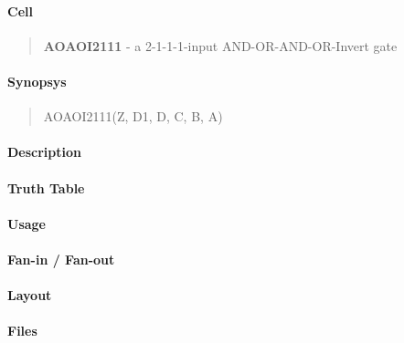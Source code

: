 \label{AOAOI2111}
\paragraph{Cell}
\begin{quote}
    \textbf{AOAOI2111} - a 2-1-1-1-input AND-OR-AND-OR-Invert gate
\end{quote}

\paragraph{Synopsys}
\begin{quote}
    AOAOI2111(Z, D1, D, C, B, A)
\end{quote}

\paragraph{Description}

%

\paragraph{Truth Table}
%

\paragraph{Usage}

\paragraph{Fan-in / Fan-out}

\paragraph{Layout}

\paragraph{Files}
